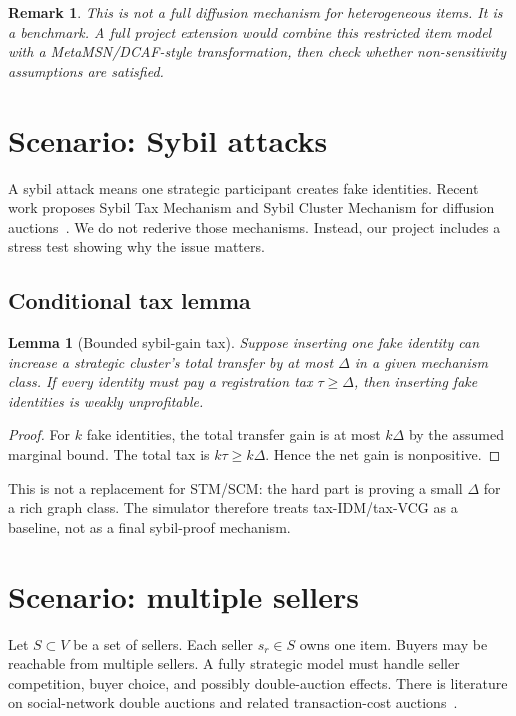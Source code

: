 \documentclass[11pt]{article}
\newtheorem{lemma}{Lemma}
\newtheorem{remark}{Remark}
\begin{document}
\begin{remark}
This is not a full diffusion mechanism for heterogeneous items.  It is a benchmark.  A full project extension would combine this restricted item model with a MetaMSN/DCAF-style transformation, then check whether non-sensitivity assumptions are satisfied.
\end{remark}

\section{Scenario: Sybil attacks}

A sybil attack means one strategic participant creates fake identities.  Recent work proposes Sybil Tax Mechanism and Sybil Cluster Mechanism for diffusion auctions~\cite{chen2023sybil}.  We do not rederive those mechanisms.  Instead, our project includes a stress test showing why the issue matters.

\subsection{Conditional tax lemma}

\begin{lemma}[Bounded sybil-gain tax]
Suppose inserting one fake identity can increase a strategic cluster's total transfer by at most $\Delta$ in a given mechanism class.  If every identity must pay a registration tax $\tau\ge \Delta$, then inserting fake identities is weakly unprofitable.
\end{lemma}

\begin{proof}
For $k$ fake identities, the total transfer gain is at most $k\Delta$ by the assumed marginal bound.  The total tax is $k\tau\ge k\Delta$.  Hence the net gain is nonpositive.
\end{proof}

This is not a replacement for STM/SCM: the hard part is proving a small $\Delta$ for a rich graph class.  The simulator therefore treats tax-IDM/tax-VCG as a baseline, not as a final sybil-proof mechanism.

\section{Scenario: multiple sellers}

Let $S\subset V$ be a set of sellers.  Each seller $s_r\in S$ owns one item.  Buyers may be reachable from multiple sellers.  A fully strategic model must handle seller competition, buyer choice, and possibly double-auction effects.  There is literature on social-network double auctions and related transaction-cost auctions~\cite{xu2020double,li2024transaction}.
\end{document}
